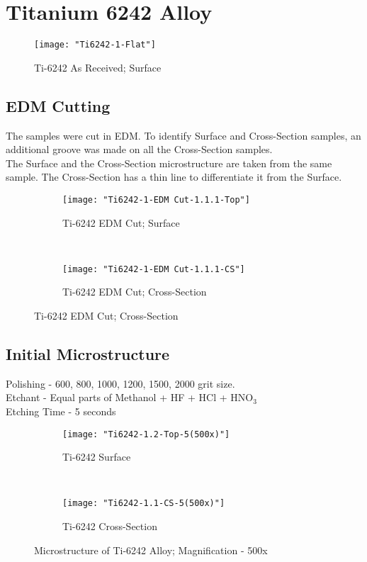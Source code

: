 \newpage
\renewcommand{\workingDate}{\textsc{2017 $|$ August $|$ 22}}

\section{Titanium 6242 Alloy} 

\begin{figure}[H]
    \centering
        \texttt{[image: "Ti6242-1-Flat"]}
        \caption{Ti-6242 As Received; Surface}
    \label{fig:EDM-Cut}
\end{figure}



\subsection{EDM Cutting}
The samples were cut in EDM. To identify Surface and Cross-Section samples, an additional groove was made on all the Cross-Section samples. 
\\
The Surface and the Cross-Section microstructure are taken from the same sample. The Cross-Section has a thin line to differentiate it from the Surface.


\begin{figure}[H]
    \centering
    \begin{subfigure}{0.40\textwidth}
        \texttt{[image: "Ti6242-1-EDM Cut-1.1.1-Top"]}
        \caption{Ti-6242 EDM Cut; Surface}
        \label{fig:2a}
    \end{subfigure}
    ~
    \begin{subfigure}{0.40\textwidth}
        \texttt{[image: "Ti6242-1-EDM Cut-1.1.1-CS"]}
        \caption{Ti-6242 EDM Cut; Cross-Section}
        \label{fig:2b}
    \end{subfigure}
    \label{fig:Ti-6242 EDM Cut; Cross-Section}
\end{figure}


\subsection{Initial Microstructure}
Polishing - 600, 800, 1000, 1200, 1500, 2000 grit size. \\
Etchant - Equal parts of Methanol + HF + HCl + HNO$_{3}$ \\
Etching Time - 5 seconds

\begin{figure}[H]
    \centering
    \begin{subfigure}{0.49\textwidth}
        \texttt{[image: "Ti6242-1.2-Top-5(500x)"]}
        \caption{Ti-6242 Surface}
        \label{fig:Ti-6242 Surface}
    \end{subfigure}
    ~
    \begin{subfigure}{0.49\textwidth}
        \texttt{[image: "Ti6242-1.1-CS-5(500x)"]}
        \caption{Ti-6242 Cross-Section}
        \label{fig:Ti-6242 Cross-Section}
    \end{subfigure}
  
    \caption{Microstructure of Ti-6242 Alloy; Magnification - 500x}
    \label{fig:As-Received}
\end{figure}


